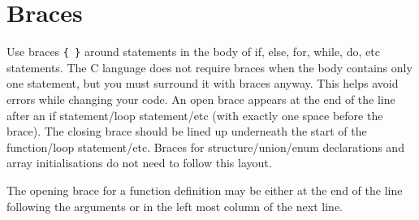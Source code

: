 \documentclass{article}
\begin{document}
\section{Braces}
Use braces \texttt{\{ \}} around statements in the body of if, else, for, while, do, etc statements.
The C language does not require braces when the body contains only one statement, but you must 
surround it with braces anyway.
This helps avoid errors while changing your code.
An open brace appears at the end of the line after an if statement/loop statement/etc (with exactly 
one space before the brace).
The closing brace should be lined up underneath the start of the function/loop statement/etc.
Braces for structure/union/enum declarations and array initialisations do not need to follow this layout.

The opening brace for a function definition may be either at the end of the line following the 
arguments or in the left most column of the next line.
\end{document}
